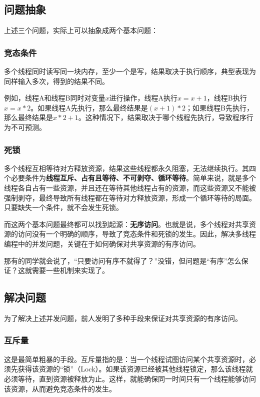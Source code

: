 \subsection{问题抽象}

上述三个问题，实际上可以抽象成两个基本问题：

\subsubsection{竞态条件}

多个线程同时读写同一块内存，至少一个是写，结果取决于执行顺序，典型表现为同样输入多次，得到的结果不同。

例如，线程A和线程B同时对变量$x$进行操作，线程A执行$x = x + 1$，线程B执行$x = x * 2$。如果线程A先执行，那么最终结果是$(x + 1) * 2$；如果线程B先执行，那么最终结果是$x * 2 + 1$。这种情况下，结果取决于哪个线程先执行，导致程序行为不可预测。

\subsubsection{死锁}

多个线程互相等待对方释放资源，结果这些线程都永久阻塞，无法继续执行。其四个必要条件为\textbf{线程互斥、占有且等待、不可剥夺、循环等待}。简单来说，就是多个线程各自占有一些资源，并且还在等待其他线程占有的资源，而这些资源又不能被强制剥夺，最终导致所有线程都在等待对方释放资源，形成一个循环等待的局面。只要缺失一个条件，就不会发生死锁。

而这两个基本问题最终都可以找到起源：\textbf{无序访问}。也就是说，多个线程对共享资源的访问没有一个明确的顺序，导致了竞态条件和死锁的发生。因此，解决多线程编程中的并发问题，关键在于如何确保对共享资源的有序访问。

那有的同学就会说了，“只要访问有序不就得了？”没错，但问题是“有序”怎么保证？这就需要一些机制来实现了。

\subsection{解决问题}

为了解决上述并发问题，前人发明了多种手段来保证对共享资源的有序访问。

\subsubsection{互斥量}

这是最简单粗暴的手段。互斥量指的是：当一个线程试图访问某个共享资源时，必须先获得该资源的“锁”（Lock）。如果该资源已经被其他线程锁定，那么该线程就必须等待，直到资源被释放为止。这样，就能确保同一时间只有一个线程能够访问该资源，从而避免竞态条件的发生。

